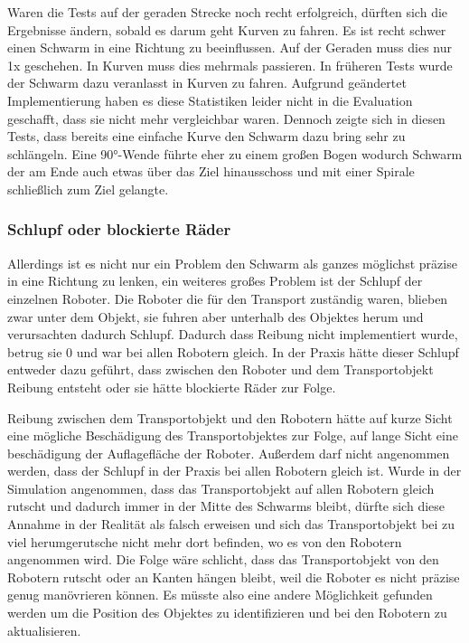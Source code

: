 Waren die Tests auf der geraden Strecke noch recht erfolgreich, dürften sich die Ergebnisse ändern, sobald es darum geht Kurven zu fahren. Es ist recht schwer einen Schwarm in eine Richtung zu beeinflussen. Auf der Geraden muss dies nur 1x geschehen. In Kurven muss dies mehrmals passieren. In früheren Tests wurde der Schwarm dazu veranlasst in Kurven zu fahren. Aufgrund geändertet Implementierung haben es diese Statistiken leider nicht in die Evaluation geschafft, dass sie nicht mehr vergleichbar waren. Dennoch zeigte sich in diesen Tests, dass bereits eine einfache Kurve den Schwarm dazu bring sehr zu schlängeln. Eine 90°-Wende führte eher zu einem großen Bogen wodurch Schwarm der am Ende auch etwas über das Ziel hinausschoss und mit einer Spirale schließlich zum Ziel gelangte.


\subsubsection*{Schlupf oder blockierte Räder}
Allerdings ist es nicht nur ein Problem den Schwarm als ganzes möglichst präzise in eine Richtung zu lenken, ein weiteres großes Problem ist der Schlupf der einzelnen Roboter.
Die Roboter die für den Transport zuständig waren, blieben zwar unter dem Objekt, sie fuhren aber unterhalb des Objektes herum und verursachten dadurch Schlupf. Dadurch dass Reibung nicht implementiert wurde, betrug sie 0 und war bei allen Robotern gleich. In der Praxis hätte dieser Schlupf entweder dazu geführt, dass zwischen den Roboter und dem Transportobjekt Reibung entsteht oder sie hätte blockierte Räder zur Folge.

Reibung zwischen dem Transportobjekt und den Robotern hätte auf kurze Sicht eine mögliche Beschädigung des Transportobjektes zur Folge, auf lange Sicht eine beschädigung der Auflagefläche der Roboter. Außerdem darf nicht angenommen werden, dass der Schlupf in der Praxis bei allen Robotern gleich ist. Wurde in der Simulation angenommen, dass das Transportobjekt auf allen Robotern gleich rutscht und dadurch immer in der Mitte des Schwarms bleibt, dürfte sich diese Annahme in der Realität als falsch erweisen und sich das Transportobjekt bei zu viel herumgerutsche nicht mehr dort befinden, wo es von den Robotern angenommen wird. Die Folge wäre schlicht, dass das Transportobjekt von den Robotern rutscht oder an Kanten hängen bleibt, weil die Roboter es nicht präzise genug manövrieren können. Es müsste also eine andere Möglichkeit gefunden werden um die Position des Objektes zu identifizieren und bei den Robotern zu aktualisieren.

